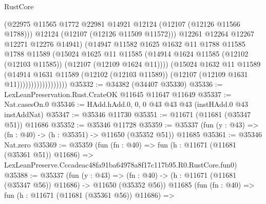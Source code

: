 \begin{lexlean}{RustCore}
\begin{coremodule}
                                  (@22975
                                    @11565
                                    @1772
                                    @22981
                                    @14921
                                    @12124
                                    (@12107 (@12126 @11566 @1788)))
                                  @12124
                                  (@12107 (@12126 @11509 @11572)))
                                @12261
                                @12264
                                @12267
                                @12271
                                @12276
                                @14941)
                              (@14947
                                @11582
                                @1625
                                @1632
                                @11
                                @1788
                                @11585
                                @1788
                                @11589
                                (@15024
                                  @1625
                                  @11
                                  @11585
                                  (@14914
                                    @1624
                                    @11585
                                    (@12102 (@12103 @11585))
                                    (@12107 (@12109 @1624 @11))))
                                (@15024
                                  @1632
                                  @11
                                  @11589
                                  (@14914
                                    @1631
                                    @11589
                                    (@12102 (@12103 @11589))
                                    (@12107 (@12109 @1631 @11))))))))))))))))))
@35332 := @34382 (@34407 @35330)
@35336 := LexLeanPreservation.Rust.CrateOK @11645 @11647 @11649
@35337 := Nat.casesOn.{0}
@35346 := HAdd.hAdd.{0, 0, 0} @43 @43 @43 (instHAdd.{0} @43 instAddNat)
@35347 := @35346 @11730
@35351 := @11671 (@11681 (@35347 @51)) @11686
@35352 := @35346 @11728
@35359 := @35337 (fun (y : @43) => (fn : @40) -> (h : @35351) -> @11650 (@35352 @51)) @11685
@35361 := @35346 Nat.zero
@35369 := @35359
    (fun (fn : @40) =>
    fun (h : @11671 (@11681 (@35361 @51)) @11686) =>
    LexLeanPreserve.Cccadeac48fa91ba64978a8f17c117b95.R0.RustCore.fun0)
@35388 := @35337
    (fun (y : @43) =>
    (fn : @40) -> (h : @11671 (@11681 (@35347 @56)) @11686) -> @11650 (@35352 @56))
    @11685
    (fun (fn : @40) =>
    fun (h : @11671 (@11681 (@35361 @56)) @11686) =>

\end{coremodule}
\end{lexlean}
